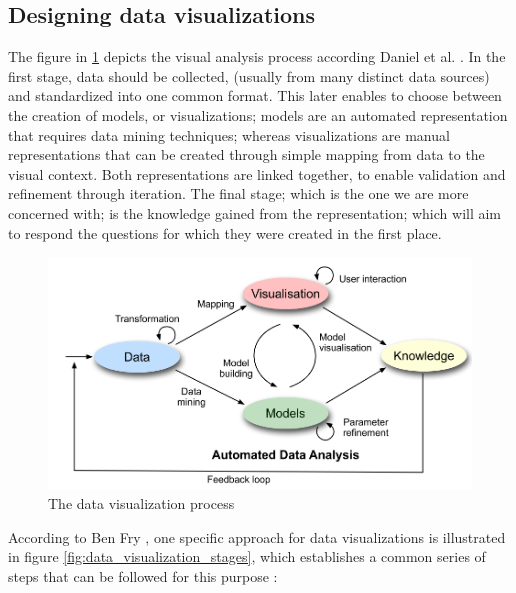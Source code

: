 \subsection{Designing data visualizations}
The figure in \ref{fig:data_visualization_process} depicts the visual analysis process according Daniel et al. \cite{KeimDaniel2010}. In the first stage,  data should be collected, (usually from many distinct data sources) and standardized into one common format. This later enables to choose between the creation of models, or visualizations; models are an automated representation that requires data mining techniques; whereas visualizations are manual representations that can be created through simple mapping from data to the visual context. Both representations are linked together, to enable validation and refinement through iteration. The final stage; which is the one we are more concerned with; is the knowledge gained from the representation; which will aim to respond the questions for which they were created in the first place.
\begin{figure}[!htb]
\begin{adjustbox}{width=1\textwidth,center=\textwidth}
  \centering
  \includegraphics[scale=1]{images/data_visualization_process.png}
\end{adjustbox}
  \caption[The data visualization process \cite{KeimDaniel2010} ]{The data visualization process \cite{KeimDaniel2010} }
  \label{fig:data_visualization_process}
\end{figure}

According to Ben Fry \cite{Cleveland1993}, one specific approach for data visualizations is illustrated in figure \ref{fig:data_visualization_stages}, which establishes a common series of steps that can be followed for this purpose :

